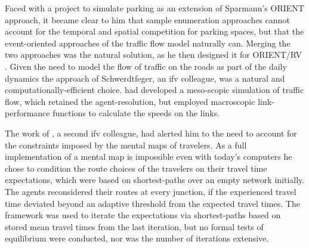 Faced with a project to simulate parking as an extension of Sparmann's ORIENT approach, it became clear to him that sample enumeration approaches cannot account for the temporal and spatial competition for parking spaces, but that the event-oriented approaches of the traffic flow model naturally can. 
Merging the two approaches was the natural solution, as he then designed it for ORIENT/RV \citep[][]{Axhausen_TechRep_IFV_1989}. 
Given the need to model the flow of traffic on the roads as part of the daily dynamics the approach of Schwerdtfeger, an \gls{ifv} colleague, was a natural and computationally-efficient choice. 
\citet[][]{Schwerdtfeger_VolmulerHamerslag_1984} had developed a meso-scopic simulation of traffic flow, which retained the agent-resolution, but employed macroscopic link-performance functions to calculate the speeds on the links. 

The work of \citet[][]{Swiderski_CarpenterJones_1983}, a second \gls{ifv} colleague, had alerted him to the need to account for the constraints imposed by the mental maps of travelers. As a full implementation of a mental map is impossible even with today's computers he chose to condition the route choices of the travelers on their travel time expectations, which were based on shortest-paths over an empty network initially. The agents reconsidered their routes at every junction, if the experienced travel time deviated beyond an adaptive threshold from the expected travel times. 
%
The framework was used to iterate \citep[][]{Axhausen_Jones_1990} the expectations via shortest-paths based on stored mean travel times from the last iteration, but no formal tests of equilibrium were conducted, nor was the number of iterations extensive. 


